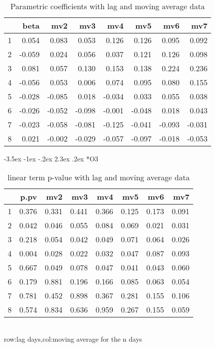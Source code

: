 \documentclass[a4paper, 12pt]{article}
\makeatletter
\def\large{\fontsize{14}{20}\selectfont}
\renewcommand\subsection{\@startsection {subsection}{1}{\z@}%
                                   {-3.5ex \@plus -1ex \@minus -.2ex}%
                                   {2.3ex \@plus.2ex}%
                                   {\centering\normalfont\large\bfseries}}
\makeatother
\begin{document}
\begin{table}[h]
\centering
\caption{Parametric coefficients with lag and moving average data}
\begin{tabular}{rrrrrrrr}
  \hline
 & beta & mv2 & mv3 & mv4 & mv5 & mv6 & mv7 \\
  \hline
1 & 0.054 & 0.083 & 0.053 & 0.126 & 0.126 & 0.095 & 0.092 \\
  2 & -0.059 & 0.024 & 0.056 & 0.037 & 0.121 & 0.126 & 0.098 \\
  3 & 0.081 & 0.057 & 0.130 & 0.153 & 0.138 & 0.224 & 0.236 \\
  4 & -0.056 & 0.053 & 0.006 & 0.074 & 0.095 & 0.080 & 0.155 \\
  5 & -0.028 & -0.085 & 0.018 & -0.034 & 0.033 & 0.055 & 0.038 \\
  6 & -0.026 & -0.052 & -0.098 & -0.001 & -0.048 & 0.018 & 0.043 \\
  7 & -0.023 & -0.058 & -0.081 & -0.125 & -0.041 & -0.093 & -0.031 \\
  8 & 0.021 & -0.002 & -0.029 & -0.057 & -0.097 & -0.018 & -0.053 \\
   \hline
\end{tabular}
\end{table}
\clearpage
\subsection*{O3}
\begin{table}[h]
\centering
\caption{linear term p-value with lag and moving average data}
\begin{tabular}{rrrrrrrr}
  \hline
 & p.pv & mv2 & mv3 & mv4 & mv5 & mv6 & mv7 \\
  \hline
1 & 0.376 & 0.331 & 0.441 & 0.366 & 0.125 & 0.173 & 0.091 \\
  2 & 0.042 & 0.046 & 0.055 & 0.084 & 0.069 & 0.021 & 0.031 \\
  3 & 0.218 & 0.054 & 0.042 & 0.049 & 0.071 & 0.064 & 0.026 \\
  4 & 0.004 & 0.028 & 0.022 & 0.032 & 0.047 & 0.087 & 0.093 \\
  5 & 0.667 & 0.049 & 0.078 & 0.047 & 0.041 & 0.043 & 0.060 \\
  6 & 0.179 & 0.881 & 0.196 & 0.166 & 0.085 & 0.063 & 0.054 \\
  7 & 0.781 & 0.452 & 0.898 & 0.367 & 0.281 & 0.155 & 0.106 \\
  8 & 0.574 & 0.834 & 0.636 & 0.959 & 0.267 & 0.155 & 0.059 \\
   \hline
\end{tabular}
\\row:lag days,col:moving average for the n days
\end{table}
\end{document}
